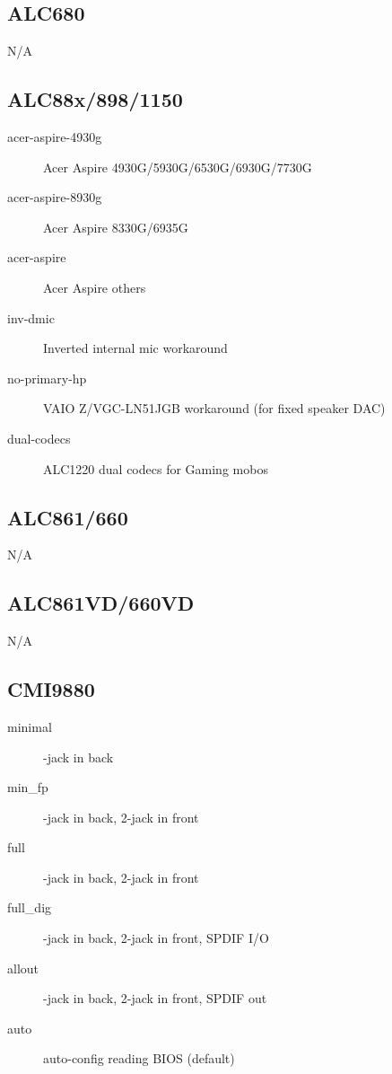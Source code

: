 \documentclass[a4paper,8pt,english]{sphinxmanual}
\begin{document}
\subsection{ALC680}
\label{sound/hd-audio/models:alc680}
N/A


\subsection{ALC88x/898/1150}
\label{sound/hd-audio/models:alc88x-898-1150}\begin{description}
\item[{acer-aspire-4930g}] \leavevmode
Acer Aspire 4930G/5930G/6530G/6930G/7730G

\item[{acer-aspire-8930g}] \leavevmode
Acer Aspire 8330G/6935G

\item[{acer-aspire}] \leavevmode
Acer Aspire others

\item[{inv-dmic}] \leavevmode
Inverted internal mic workaround

\item[{no-primary-hp}] \leavevmode
VAIO Z/VGC-LN51JGB workaround (for fixed speaker DAC)

\item[{dual-codecs}] \leavevmode
ALC1220 dual codecs for Gaming mobos

\end{description}


\subsection{ALC861/660}
\label{sound/hd-audio/models:alc861-660}
N/A


\subsection{ALC861VD/660VD}
\label{sound/hd-audio/models:alc861vd-660vd}
N/A


\subsection{CMI9880}
\label{sound/hd-audio/models:cmi9880}\begin{description}
\item[{minimal}] -jack in back

\item[{min\_fp}] -jack in back, 2-jack in front

\item[{full}] -jack in back, 2-jack in front

\item[{full\_dig}] -jack in back, 2-jack in front, SPDIF I/O

\item[{allout}] -jack in back, 2-jack in front, SPDIF out

\item[{auto}] \leavevmode
auto-config reading BIOS (default)

\end{description}
\end{document}
